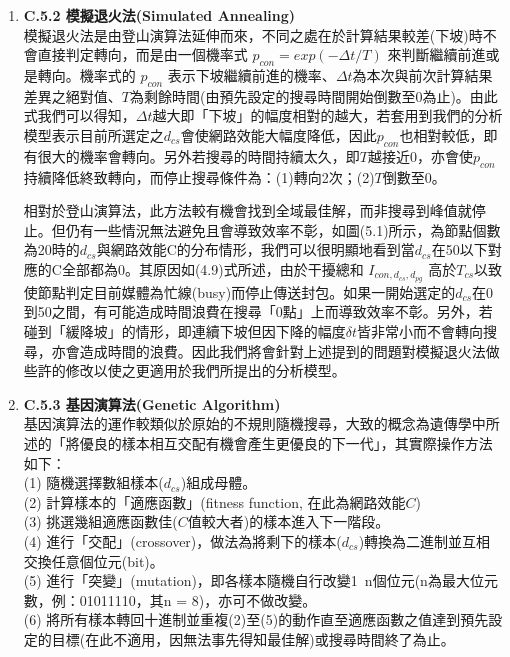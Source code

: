 \documentclass[12pt,a4paper]{article}
\begin{document}
\begin{description}
\begin{enumerate}
\item [\bf ]{\textbf{\Kai C.5.2 模擬退火法(Simulated Annealing)  }}\\

模擬退火法是由登山演算法延伸而來，不同之處在於計算結果較差(下坡)時不會直接判定轉向，而是由一個機率式 $p_{con} = exp (- \Delta t / T)$ 來判斷繼續前進或是轉向。機率式的 $p_{con}$ 表示下坡繼續前進的機率、$\Delta t$為本次與前次計算結果差異之絕對值、$T$為剩餘時間(由預先設定的搜尋時間開始倒數至0為止)。由此式我們可以得知，$\Delta t$越大即「下坡」的幅度相對的越大，若套用到我們的分析模型表示目前所選定之$d_{cs}$會使網路效能大幅度降低，因此$p_{con}$也相對較低，即有很大的機率會轉向。另外若搜尋的時間持續太久，即$T$越接近0，亦會使$p_{con}$持續降低終致轉向，而停止搜尋條件為：(1)轉向2次；(2)$T$倒數至0。

相對於登山演算法，此方法較有機會找到全域最佳解，而非搜尋到峰值就停止。但仍有一些情況無法避免且會導致效率不彰，如圖(5.1)所示，為節點個數為20時的$d_{cs}$與網路效能C的分布情形，我們可以很明顯地看到當$d_{cs}$在50以下對應的C全部都為0。其原因如(4.9)式所述，由於干擾總和 $I_{con,d_{cs},d_{pg}}$ 高於$T_{cs}$以致使節點判定目前媒體為忙線(busy)而停止傳送封包。如果一開始選定的$d_{cs}$在0到50之間，有可能造成時間浪費在搜尋「0點」上而導致效率不彰。另外，若碰到「緩降坡」的情形，即連續下坡但因下降的幅度$\delta t$皆非常小而不會轉向搜尋，亦會造成時間的浪費。因此我們將會針對上述提到的問題對模擬退火法做些許的修改以使之更適用於我們所提出的分析模型。\\


\item [\bf ]{\textbf{\Kai C.5.3 基因演算法(Genetic Algorithm)  }}\\

基因演算法的運作較類似於原始的不規則隨機搜尋，大致的概念為遺傳學中所述的「將優良的樣本相互交配有機會產生更優良的下一代」，其實際操作方法如下：\\
(1) 隨機選擇數組樣本($d_{cs}$)組成母體。\\
(2) 計算樣本的「適應函數」(fitness function, 在此為網路效能$C$)\\
(3) 挑選幾組適應函數佳($C$值較大者)的樣本進入下一階段。\\
(4) 進行「交配」(crossover)，做法為將剩下的樣本($d_{cs}$)轉換為二進制並互相交換任意個位元(bit)。\\
(5) 進行「突變」(mutation)，即各樣本隨機自行改變1~n個位元(n為最大位元數，例：01011110，其n = 8)，亦可不做改變。\\
(6) 將所有樣本轉回十進制並重複(2)至(5)的動作直至適應函數之值達到預先設定的目標(在此不適用，因無法事先得知最佳解)或搜尋時間終了為止。\\


\end{enumerate}
\end{description}
\end{document}
